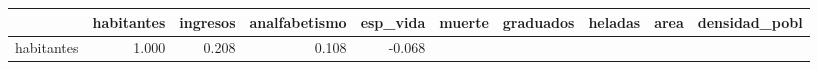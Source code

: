 \documentclass[]{article}
\begin{document}
\begin{longtable}[]{@{}lrrrrrrrrr@{}}
\toprule
\begin{minipage}[b]{0.10\columnwidth}\raggedright\strut
\strut
\end{minipage} & \begin{minipage}[b]{0.08\columnwidth}\raggedleft\strut
habitantes\strut
\end{minipage} & \begin{minipage}[b]{0.07\columnwidth}\raggedleft\strut
ingresos\strut
\end{minipage} & \begin{minipage}[b]{0.10\columnwidth}\raggedleft\strut
analfabetismo\strut
\end{minipage} & \begin{minipage}[b]{0.07\columnwidth}\raggedleft\strut
esp\_vida\strut
\end{minipage} & \begin{minipage}[b]{0.05\columnwidth}\raggedleft\strut
muerte\strut
\end{minipage} & \begin{minipage}[b]{0.07\columnwidth}\raggedleft\strut
graduados\strut
\end{minipage} & \begin{minipage}[b]{0.06\columnwidth}\raggedleft\strut
heladas\strut
\end{minipage} & \begin{minipage}[b]{0.05\columnwidth}\raggedleft\strut
area\strut
\end{minipage} & \begin{minipage}[b]{0.10\columnwidth}\raggedleft\strut
densidad\_pobl\strut
\end{minipage}\tabularnewline
\midrule
\endhead
\begin{minipage}[t]{0.10\columnwidth}\raggedright\strut
habitantes\strut
\end{minipage} & \begin{minipage}[t]{0.08\columnwidth}\raggedleft\strut
1.000\strut
\end{minipage} & \begin{minipage}[t]{0.07\columnwidth}\raggedleft\strut
0.208\strut
\end{minipage} & \begin{minipage}[t]{0.10\columnwidth}\raggedleft\strut
0.108\strut
\end{minipage} & \begin{minipage}[t]{0.07\columnwidth}\raggedleft\strut
-0.068\strut
\end{minipage} & \begin{minipage}[t]{0.05\columnwidth}\raggedleft\strut

\end{minipage}
\end{longtable}
\end{document}
